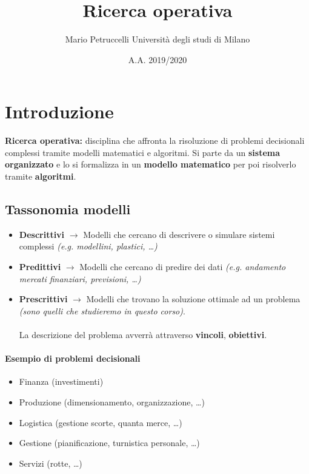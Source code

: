 \documentclass[12pt, twoside, letterpaper]{article}
\title{Ricerca operativa}
\author{Mario Petruccelli \cr Università degli studi di Milano}
\date{A.A. 2019/2020}
\begin{document}
	\begin{titlepage}
		\maketitle
		\newpage
		\tableofcontents
	\end{titlepage}


	\section{Introduzione}
	
		\textbf{Ricerca operativa:} disciplina che affronta la risoluzione di problemi decisionali complessi tramite 	modelli matematici e algoritmi.
	Si parte da un \textbf{sistema organizzato} e lo si formalizza in un \textbf{modello matematico} per poi risolverlo tramite \textbf{algoritmi}.
		\subsection{Tassonomia modelli}
		\begin{itemize}
			\item \textbf{Descrittivi} $\rightarrow$ Modelli che cercano di descrivere o simulare sistemi complessi \textit{(e.g. modellini, plastici, \dots)}
			\item \textbf{Predittivi} $\rightarrow$ Modelli che cercano di predire dei dati \textit{(e.g. andamento mercati finanziari, previsioni, \dots)}
			\item \textbf{Prescrittivi} $\rightarrow$ Modelli che trovano la soluzione ottimale ad un problema \textit{(sono quelli che studieremo in questo corso)}. 
			\\\\La descrizione del problema avverrà attraverso \textbf{vincoli}, \textbf{obiettivi}.
		\end{itemize}
		\paragraph{Esempio di problemi decisionali}
		\begin{itemize}
			\item Finanza (investimenti)
			\item Produzione (dimensionamento, organizzazione, \dots)
			\item Logistica (gestione scorte, quanta merce, \dots)
			\item Gestione (pianificazione, turnistica personale, \dots)
			\item Servizi (rotte, \dots)
		\end{itemize}
\end{document}
